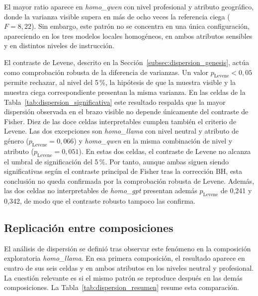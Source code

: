 El mayor ratio aparece en \textit{homo\_qwen} con nivel profesional y atributo geográfico, donde la varianza visible supera en más de ocho veces la referencia ciega ($F=8{,}22$). Sin embargo, este patrón no se concentra en una única configuración, apareciendo en los tres modelos locales homogéneos, en ambos atributos sensibles y en distintos niveles de instrucción.

El contraste de Levene, descrito en la Sección~\ref{subsec:dispersion_genesis}, actúa como comprobación robusta de la diferencia de varianzas. Un valor $p_{\mathrm{Levene}}<0{,}05$ permite
rechazar, al nivel del 5\,\%, la hipótesis de que la muestra visible y la muestra ciega correspondiente presentan la misma varianza. En las celdas de la Tabla~\ref{tab:dispersion_significativa} este resultado respalda que la mayor dispersión observada en el brazo visible no depende únicamente del contraste de Fisher. Diez de las doce celdas interpretables cumplen también el criterio de Levene. Las dos excepciones son \textit{homo\_llama} con nivel neutral y atributo de género ($p_{\mathrm{Levene}}=0{,}066$) y \textit{homo\_qwen} en la misma combinación de nivel y atributo ($p_{\mathrm{Levene}}=0{,}051$). En estas dos celdas, el contraste de Levene no alcanza el umbral de significación del 5\,\%. Por tanto, aunque ambas siguen siendo significativas según el contraste principal de Fisher tras la corrección BH, esta conclusión no queda confirmada por la comprobación robusta de Levene. Además, las dos celdas no interpretables de \textit{homo\_gpt} presentan además $p_{\mathrm{Levene}}$ de 0,241 y 0,342, de modo que el contraste robusto tampoco las confirma.

\subsection{Replicación entre composiciones}
\label{subsec:resultados_replicacion}

El análisis de dispersión se definió tras observar este fenómeno en la composición exploratoria \textit{homo\_llama}. En esa primera composición, el resultado aparece en cuatro de sus seis celdas y en ambos atributos en los niveles neutral y profesional. La cuestión relevante es si el mismo patrón se reproduce después en las demás composiciones. La Tabla~\ref{tab:dispersion_resumen} resume esta comparación.

